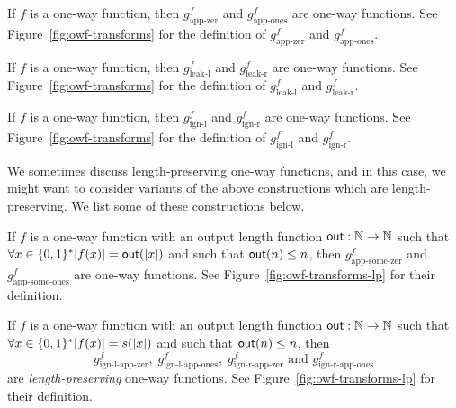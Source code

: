 \begin{theorem}\label{thm:owf-app-zer}
If $f$ is a one-way function, then $g^f_{\text{app-zer}}$ and $g^f_{\text{app-ones}}$ are one-way functions. See Figure~\ref{fig:owf-transforms} for the definition of $g^f_{\text{app-zer}}$ and $g^f_{\text{app-ones}}$.
\end{theorem}
\begin{theorem}
If $f$ is a one-way function, then $g^f_{\text{leak-l}}$ and $g^f_{\text{leak-r}}$ are one-way functions. See Figure~\ref{fig:owf-transforms} for the definition of $g^f_{\text{leak-l}}$ and $g^f_{\text{leak-r}}$.
\end{theorem}
\begin{theorem}
If $f$ is a one-way function, then $g^f_{\text{ign-l}}$ and $g^f_{\text{ign-r}}$ are one-way functions. See Figure~\ref{fig:owf-transforms} for the definition of $g^f_{\text{ign-l}}$ and $g^f_{\text{ign-r}}$.
\end{theorem}
We sometimes discuss length-preserving one-way functions, and in this case, we might want to consider variants of the above constructions which are length-preserving. We list some of these constructions below.
\begin{theorem}
If $f$ is a one-way function with an output length function $\mathsf{out}:\mathbb{N}\rightarrow\mathbb{N}$ such that $\forall x\in\bin^* \abs{f(x)}=\O{out}(\abs{x})$ and such that $\mathsf{out}(n)\leq n$, then $g^f_{\text{app-some-zer}}$ and $g^f_{\text{app-some-ones}}$ are one-way functions. See Figure~\ref{fig:owf-transforms-lp} for their definition.
\end{theorem}
\begin{theorem}
If $f$ is a one-way function with an output length function $\mathsf{out}:\mathbb{N}\rightarrow\mathbb{N}$ such that $\forall x\in\bin^* \abs{f(x)}=s(\abs{x})$ and such that $\mathsf{out}(n)\leq n$, then
\[g^f_{\text{ign-l-app-zer}},\;
  g^f_{\text{ign-l-app-ones}},\;
  g^f_{\text{ign-r-app-zer}}\text{ and }
  g^f_{\text{ign-r-app-ones}}\]
are \emph{length-preserving} one-way functions. See Figure~\ref{fig:owf-transforms-lp} for their definition.
\end{theorem}

